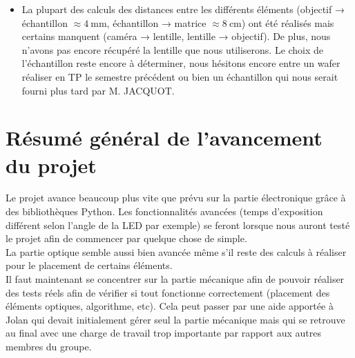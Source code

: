 \documentclass[12pt, a4paper]{article}
\begin{document}
\begin{itemize}
	\item La plupart des calculs des distances entre les différents éléments (objectif → échantillon $\approx \SI{4}{\milli\meter}$, échantillon → matrice $\approx \SI{8}{\centi\meter}$) ont été réalisés mais certains manquent (caméra → lentille, lentille → objectif). De plus, nous n'avons pas encore récupéré la lentille que nous utiliserons. Le choix de l'échantillon reste encore à déterminer, nous hésitons encore entre un wafer réaliser en TP le semestre précédent ou bien un échantillon qui nous serait fourni plus tard par M. JACQUOT.
\end{itemize}

\section{Résumé général de l'avancement du projet}

Le projet avance beaucoup plus vite que prévu sur la partie électronique grâce à des bibliothèques Python. Les fonctionnalités avancées (temps d'exposition différent selon l'angle de la LED par exemple) se feront lorsque nous auront testé le projet afin de commencer par quelque chose de simple. \\
La partie optique semble aussi bien avancée même s'il reste des calculs à réaliser pour le placement de certains éléments. \\
Il faut maintenant se concentrer sur la partie mécanique afin de pouvoir réaliser des tests réels afin de vérifier si tout fonctionne correctement (placement des éléments optiques, algorithme, etc). Cela peut passer par une aide apportée à Jolan qui devait initialement gérer seul la partie mécanique mais qui se retrouve au final avec une charge de travail trop importante par rapport aux autres membres du groupe.
\end{document}
